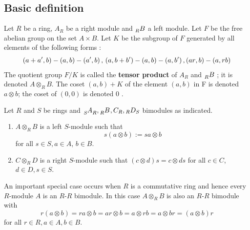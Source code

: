 \subsection{Basic definition} %
\begin{definition}
    Let $R$ be a ring, $A_R$ be a right module and $\prescript{}{R}{B}$ a left module.
    Let $F$ be the free abelian group on the set $A \times B$.
    Let $K$ be the subgroup of $F$ generated by all elements of the following forms :
    \begin{equation*}
        \left(a+a^{\prime}, b\right)-(a, b)-\left(a^{\prime}, b\right), \\
        \left({a}, {b}+{b}^{\prime}\right)-({a}, {b})-\left({a}, {b}^{\prime}\right), \\
        ({ar}, {b})-({a}, {rb})
    \end{equation*}
    The quotient group ${F} / {K}$ is called the \textbf{tensor product} of $A_R$ and $\prescript{}{R}{B} $ ;
    it is denoted $A \otimes_{{R}} B$.
    The coset $({a}, {b})+{K}$ of the element $({a}, {b})$ in F is denoted ${a} \otimes {b}$; the coset of $(0,0)$ is denoted $0$ .
\end{definition}

\begin{theorem}
    Let $R$ and $S$ be rings and $ \tensor[_S]{A}{_R}  ,\tensor[_R]{B}{}, C_{{R}},{ }_{{R}} {D}_{{S}}$ bimodules as indicated.
    \begin{enumerate}
        \item
              ${A} \otimes_{{R}} B$ is a left $S$-module such that
              \begin{equation*}
                  s(a \otimes b):=sa \otimes b
              \end{equation*}
              for all ${s} \in {S}, {a} \in A$, ${b} \in B$.
        \item
              ${C} \otimes_{{R}} {D}$ is a right $S$-module such that $({c} \otimes {d}) {s}={c} \otimes {ds}$ for all ${c} \in C$, ${d} \in {D}, {s} \in {S}$.
    \end{enumerate}
    \begin{remark}
        An important special case occurs when $R$ is a commutative ring and hence every $R$-module $A$ is an $R$-$R$ bimodule.
        In this case $A \otimes_R B$ is also an $R$-$R$ bimodule with
        \begin{equation*}
            r(a \otimes b)=r a \otimes b=a r \otimes b=a \otimes r b=a \otimes b r=(a \otimes b) r
        \end{equation*}
        for all $r \in R, a \in A, b \in B$.
    \end{remark}
\end{theorem}

